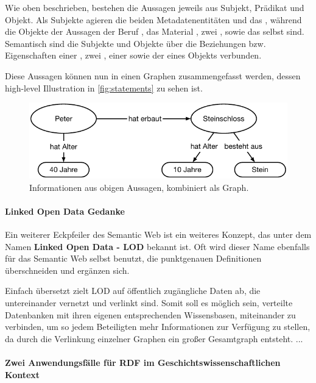 Wie oben beschrieben, bestehen die Aussagen jeweils aus Subjekt, Prädikat und Objekt. Als Subjekte agieren die beiden Metadatenentitäten  und das , während die Objekte der Aussagen der Beruf , das Material , zwei , sowie das  selbst sind. Semantisch sind die Subjekte und Objekte über die Beziehungen bzw. Eigenschaften einer , zwei , einer  sowie der  eines Objekts verbunden.

Diese Aussagen können nun in einen Graphen zusammengefasst werden, dessen high-level Illustration in \autoref{fig:statements} zu sehen ist.

\begin{figure}[htb]
    \centering
    \includegraphics[width=\textwidth]{Figures/berndl/statements}
    \caption{\label{fig:statements} Informationen aus obigen Aussagen, kombiniert als Graph.}
\end{figure}

\paragraph{Linked Open Data Gedanke}

Ein weiterer Eckpfeiler des Semantic Web ist ein weiteres Konzept, das unter dem Namen \textbf{Linked Open Data - LOD} bekannt ist. Oft wird dieser Name ebenfalls für das Semantic Web selbst benutzt, die punktgenauen Definitionen überschneiden und ergänzen sich.

Einfach übersetzt zielt LOD auf öffentlich zugängliche Daten ab, die untereinander vernetzt und verlinkt sind. Somit soll es möglich sein, verteilte Datenbanken mit ihren eigenen entsprechenden Wissensbasen, miteinander zu verbinden, um so jedem Beteiligten mehr Informationen zur Verfügung zu stellen, da durch die Verlinkung einzelner Graphen ein großer Gesamtgraph entsteht. ...

\paragraph{Zwei Anwendungsfälle für RDF im Geschichtswissenschaftlichen Kontext}

